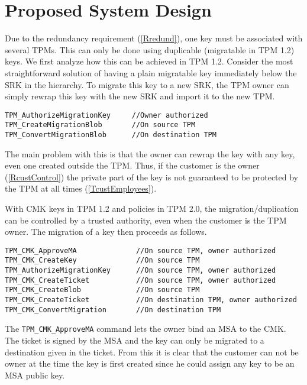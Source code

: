 {\section{Proposed System Design}
\label{sec:sol}
Due to the redundancy requirement (\ref{Rredund}), one key must be associated with several TPMs. This can only be done using duplicable (migratable in TPM 1.2) keys. We first analyze how this can be achieved in TPM 1.2. Consider the most straightforward solution of having a plain migratable key immediately below the SRK in the hierarchy. To migrate this key to a new SRK, the TPM owner can simply rewrap this key with the new SRK and import it to the new TPM.

\begin{scriptsize}
\begin{verbatim}
TPM_AuthorizeMigrationKey     //Owner authorized
TPM_CreateMigrationBlob       //On source TPM
TPM_ConvertMigrationBlob      //On destination TPM
\end{verbatim}
\end{scriptsize}
The main problem with this is that the owner can rewrap the key with any key, even one created outside the TPM. Thus, if the customer is the owner (\ref{RcustControl}) the private part of the key is not guaranteed to be protected by the TPM at all times (\ref{TcustEmployees}).

With CMK keys in TPM 1.2 and policies in TPM 2.0, the migration/duplication can be controlled by a trusted authority, even when the customer is the TPM owner. The migration of a key then proceeds as follows.

\begin{scriptsize}
\begin{verbatim}
TPM_CMK_ApproveMA              //On source TPM, owner authorized
TPM_CMK_CreateKey              //On source TPM
TPM_AuthorizeMigrationKey      //On source TPM, owner authorized
TPM_CMK_CreateTicket           //On source TPM, owner authorized
TPM_CMK_CreateBlob             //On source TPM
TPM_CMK_CreateTicket           //On destination TPM, owner authorized
TPM_CMK_ConvertMigration       //On destination TPM
\end{verbatim}
\end{scriptsize}
The \verb!TPM_CMK_ApproveMA! command lets the owner bind an MSA to the CMK. The ticket is signed by the MSA and the key can only be migrated to a destination given in the ticket. From this it is clear that the customer can not be owner at the time the key is first created since he could assign any key to be an MSA public key.

}
